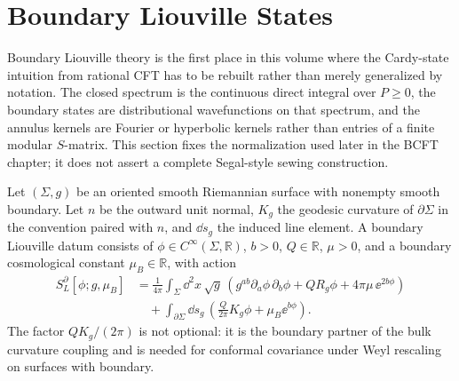 \section{Boundary Liouville States}
\label{sec:liouville-boundary-states}

Boundary Liouville theory is the first place in this volume where the
Cardy-state intuition from rational CFT has to be rebuilt rather than merely
generalized by notation.  The closed spectrum is the continuous direct
integral over \(P\ge0\), the boundary states are distributional wavefunctions
on that spectrum, and the annulus kernels are Fourier or hyperbolic kernels
rather than entries of a finite modular \(S\)-matrix.  This section fixes the
normalization used later in the BCFT chapter; it does not assert a complete
Segal-style sewing construction.

\begin{definition}
\label{def:boundary-liouville-datum}
Let \((\Sigma,g)\) be an oriented smooth Riemannian surface with nonempty
smooth boundary.  Let \(n\) be the outward unit normal, \(K_g\) the geodesic
curvature of \(\partial\Sigma\) in the convention paired with \(n\), and
\(\dd s_g\) the induced line element.  A boundary Liouville datum consists of
\(\phi\in C^\infty(\Sigma,\mathbb R)\), \(b>0\), \(Q\in\mathbb R\),
\(\mu>0\), and a boundary cosmological constant \(\mu_B\in\mathbb R\), with
action
\begin{equation}
\begin{aligned}
  S_L^\partial[\phi;g,\mu_B]
  &=
  \frac1{4\pi}
  \int_\Sigma \dd^2x\,\sqrt g\,
  \left(
    g^{ab}\partial_a\phi\,\partial_b\phi
    +Q R_g\phi
    +4\pi\mu\,\ee^{2b\phi}
  \right)
  \\
  &\quad
  +\int_{\partial\Sigma}\dd s_g\,
  \left(
    \frac{Q}{2\pi}K_g\phi+\mu_B\ee^{b\phi}
  \right).
\end{aligned}
  \label{eq:boundary-liouville-action}
\end{equation}
The factor \(QK_g/(2\pi)\) is not optional: it is the boundary partner of
the bulk curvature coupling and is needed for conformal covariance under
Weyl rescaling on surfaces with boundary.
\end{definition}

